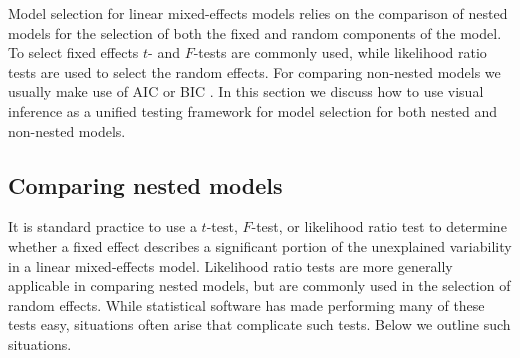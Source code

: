 \documentclass[12pt]{article} %
\newcommand{\hh}[1]{{\color{orange} #1}}
\begin{document}
 Model selection for linear mixed-effects models relies on the comparison of nested models for the selection of both the fixed and random components of the model. To select fixed effects $t$- and $F$-tests are commonly used, while likelihood ratio tests are used to select the random effects. 
 \hh{For comparing non-nested models we usually make use of  AIC or BIC  \citep{anderson1998}.}
 In this section we discuss how to use visual inference as a unified testing framework for model selection for both nested and non-nested models. 



\subsection{Comparing nested models}\label{sec:select-fixed}

It is standard practice to use a $t$-test, $F$-test, or likelihood ratio test to determine whether a fixed effect describes a significant portion of the unexplained variability in a linear mixed-effects model. Likelihood ratio tests are more generally applicable in comparing nested models, but are  commonly used in the selection of random effects. 
While statistical software has made performing many of these tests easy, situations often arise that complicate such tests. Below we outline such situations.
\end{document}
